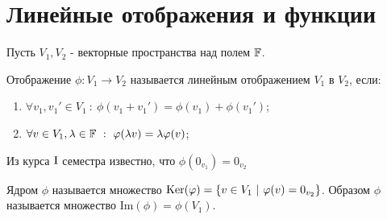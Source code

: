 \section{Линейные отображения и функции}
    Пусть $V_1, V_2$ - векторные пространства над полем $\F$.
    \begin{definition}
        Отображение $\phi: V_1 \rightarrow V_2$ называется линейным отображением $V_1$ в $V_2$, если:
        \begin{enumerate}
            \item $\forall v_1, v_1'\in V_1 \ : \ \phi(v_1 + v_1') = \phi(v_1) + \phi(v_1')$;
            \item $\forall v \in V_1, \lambda \in \F \ : \ \phi(\lambda v) = \lambda\phi(v)$;
        \end{enumerate}
    \end{definition}
        Из курса $\textup{I}$ семестра известно, что $\phi (0_{v_1}) = 0_{v_2}$
    \begin{definition}
        Ядром $\phi$ называется множество $\textup{Ker}(\phi) = \{v \in V_1 \ | \ \phi(v) = 0_{v_2}\}$. Образом $\phi$ называется множество $\text{Im}(\phi) = \phi(V_1)$.
    \end{definition}

